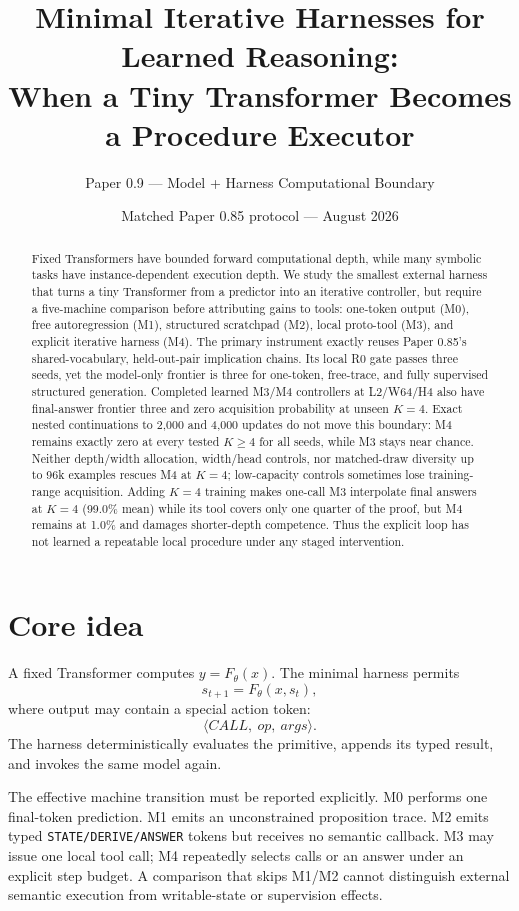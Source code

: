 \documentclass[10pt]{article}
\title{Minimal Iterative Harnesses for Learned Reasoning:\\When a Tiny Transformer Becomes a Procedure Executor}
\author{Paper 0.9 --- Model + Harness Computational Boundary}
\date{Matched Paper 0.85 protocol --- August 2026}
\begin{document}
\maketitle
\begin{abstract}
Fixed Transformers have bounded forward computational depth, while many symbolic tasks have instance-dependent execution depth. We study the smallest external harness that turns a tiny Transformer from a predictor into an iterative controller, but require a five-machine comparison before attributing gains to tools: one-token output (M0), free autoregression (M1), structured scratchpad (M2), local proto-tool (M3), and explicit iterative harness (M4). The primary instrument exactly reuses Paper 0.85's shared-vocabulary, held-out-pair implication chains. Its local R0 gate passes three seeds, yet the model-only frontier is three for one-token, free-trace, and fully supervised structured generation. Completed learned M3/M4 controllers at L2/W64/H4 also have final-answer frontier three and zero acquisition probability at unseen $K=4$. Exact nested continuations to 2,000 and 4,000 updates do not move this boundary: M4 remains exactly zero at every tested $K\ge4$ for all seeds, while M3 stays near chance. Neither depth/width allocation, width/head controls, nor matched-draw diversity up to 96k examples rescues M4 at $K=4$; low-capacity controls sometimes lose training-range acquisition. Adding $K=4$ training makes one-call M3 interpolate final answers at $K=4$ (99.0\% mean) while its tool covers only one quarter of the proof, but M4 remains at 1.0\% and damages shorter-depth competence. Thus the explicit loop has not learned a repeatable local procedure under any staged intervention.
\end{abstract}

\section{Core idea}
A fixed Transformer computes \(y=F_\theta(x)\). The minimal harness permits
\[
s_{t+1}=F_\theta(x,s_t),
\]
where output may contain a special action token:
\[
\langle CALL,\ op,\ args\rangle.
\]
The harness deterministically evaluates the primitive, appends its typed result, and invokes the same model again.

The effective machine transition must be reported explicitly. M0 performs one final-token prediction. M1 emits an unconstrained proposition trace. M2 emits typed \texttt{STATE/DERIVE/ANSWER} tokens but receives no semantic callback. M3 may issue one local tool call; M4 repeatedly selects calls or an answer under an explicit step budget. A comparison that skips M1/M2 cannot distinguish external semantic execution from writable-state or supervision effects.
\end{document}
